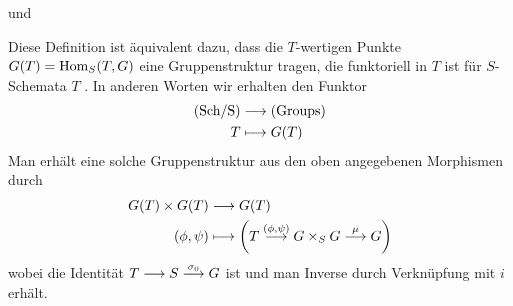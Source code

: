 \documentclass[german]{scrreprt}
\begin{document}
\begin{Definition}[$S$"=Gruppenschema]
\begin{description}[labelwidth=4cm]
    und
  \item[Assoziativität]
\end{description}
\begin{Bemerkung}
  Diese Definition ist äquivalent dazu, dass die $T$-wertigen Punkte
  $G(T)=\operatorname{Hom}_S(T,G)$ eine Gruppenstruktur tragen, die funktoriell in
  $T$ ist für $S$-Schemata $T$ \cite[Chapter (4.15)]{wedhorn}. 
  In anderen Worten wir erhalten den Funktor 
  \begin{align*}
    \text{(Sch/S)} &\longrightarrow \text{(Groups)}\\
    T &\longmapsto G(T)
  \end{align*}
  Man erhält eine solche Gruppenstruktur aus den oben angegebenen
  Morphismen durch
  \begin{align*}
    G(T)\times G(T) &\longrightarrow G(T)\\
    (\phi, \psi) &\longmapsto 
                   \left(
                   T\overset{(\phi,\psi)}{\longrightarrow} G\times_S G
                   \overset\mu{\longrightarrow} G
                   \right)
  \end{align*}
  wobei die Identität $T\longrightarrow S\overset{\sigma_0}{\longrightarrow} G$ ist und
  man Inverse durch Verknüpfung mit $i$ erhält.
  \cite[Proposition IV.3.2]{silverman2}
\end{Bemerkung}


\end{Definition}
\end{document}
